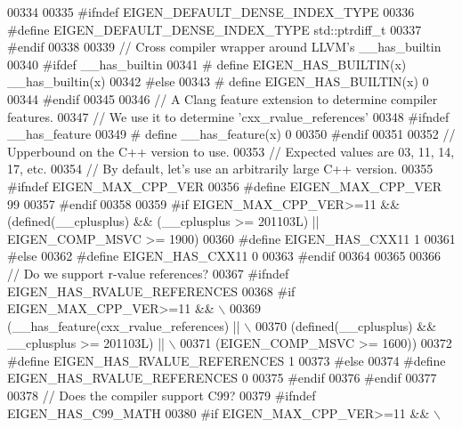 \begin{DoxyCode}
00334 
00335 \textcolor{preprocessor}{#ifndef EIGEN\_DEFAULT\_DENSE\_INDEX\_TYPE}
00336 \textcolor{preprocessor}{#define EIGEN\_DEFAULT\_DENSE\_INDEX\_TYPE std::ptrdiff\_t}
00337 \textcolor{preprocessor}{#endif}
00338 
00339 \textcolor{comment}{// Cross compiler wrapper around LLVM's \_\_has\_builtin}
00340 \textcolor{preprocessor}{#ifdef \_\_has\_builtin}
00341 \textcolor{preprocessor}{#  define EIGEN\_HAS\_BUILTIN(x) \_\_has\_builtin(x)}
00342 \textcolor{preprocessor}{#else}
00343 \textcolor{preprocessor}{#  define EIGEN\_HAS\_BUILTIN(x) 0}
00344 \textcolor{preprocessor}{#endif}
00345 
00346 \textcolor{comment}{// A Clang feature extension to determine compiler features.}
00347 \textcolor{comment}{// We use it to determine 'cxx\_rvalue\_references'}
00348 \textcolor{preprocessor}{#ifndef \_\_has\_feature}
00349 \textcolor{preprocessor}{# define \_\_has\_feature(x) 0}
00350 \textcolor{preprocessor}{#endif}
00351 
00352 \textcolor{comment}{// Upperbound on the C++ version to use.}
00353 \textcolor{comment}{// Expected values are 03, 11, 14, 17, etc.}
00354 \textcolor{comment}{// By default, let's use an arbitrarily large C++ version.}
00355 \textcolor{preprocessor}{#ifndef EIGEN\_MAX\_CPP\_VER}
00356 \textcolor{preprocessor}{#define EIGEN\_MAX\_CPP\_VER 99}
00357 \textcolor{preprocessor}{#endif}
00358 
00359 \textcolor{preprocessor}{#if EIGEN\_MAX\_CPP\_VER>=11 && (defined(\_\_cplusplus) && (\_\_cplusplus >= 201103L) || EIGEN\_COMP\_MSVC >= 1900)}
00360 \textcolor{preprocessor}{#define EIGEN\_HAS\_CXX11 1}
00361 \textcolor{preprocessor}{#else}
00362 \textcolor{preprocessor}{#define EIGEN\_HAS\_CXX11 0}
00363 \textcolor{preprocessor}{#endif}
00364 
00365 
00366 \textcolor{comment}{// Do we support r-value references?}
00367 \textcolor{preprocessor}{#ifndef EIGEN\_HAS\_RVALUE\_REFERENCES}
00368 \textcolor{preprocessor}{#if EIGEN\_MAX\_CPP\_VER>=11 && \(\backslash\)}
00369 \textcolor{preprocessor}{    (\_\_has\_feature(cxx\_rvalue\_references) || \(\backslash\)}
00370 \textcolor{preprocessor}{    (defined(\_\_cplusplus) && \_\_cplusplus >= 201103L) || \(\backslash\)}
00371 \textcolor{preprocessor}{    (EIGEN\_COMP\_MSVC >= 1600))}
00372 \textcolor{preprocessor}{  #define EIGEN\_HAS\_RVALUE\_REFERENCES 1}
00373 \textcolor{preprocessor}{#else}
00374 \textcolor{preprocessor}{  #define EIGEN\_HAS\_RVALUE\_REFERENCES 0}
00375 \textcolor{preprocessor}{#endif}
00376 \textcolor{preprocessor}{#endif}
00377 
00378 \textcolor{comment}{// Does the compiler support C99?}
00379 \textcolor{preprocessor}{#ifndef EIGEN\_HAS\_C99\_MATH}
00380 \textcolor{preprocessor}{#if EIGEN\_MAX\_CPP\_VER>=11 && \(\backslash\)}

\end{DoxyCode}
